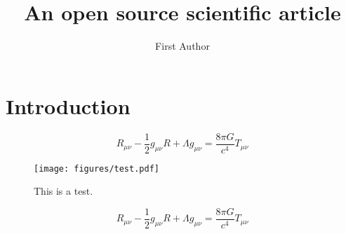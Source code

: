 \documentclass[twocolumn]{aastex631}
\begin{document}
\title{An open source scientific article}

\author[0000-0000-0000-0000]{First Author}

\begin{abstract}
    \blindtext
\end{abstract}

\section{Introduction}
\[
R_{\mu\nu}-\frac{1}{2}g_{\mu\nu}R+\Lambda g_{\mu\nu} = \frac{8\pi G}{c^4}T_{\mu\nu}
\]

\begin{figure}
    \begin{centering}
        \texttt{[image: figures/test.pdf]}
        \caption{This is a test.}
        \label{fig*:test}
    \end{centering}
\end{figure}

\Blindtext[4]

\[
R_{\mu\nu}-\frac{1}{2}g_{\mu\nu}R+\Lambda g_{\mu\nu} = \frac{8\pi G}{c^4}T_{\mu\nu}
\]
\end{document}
